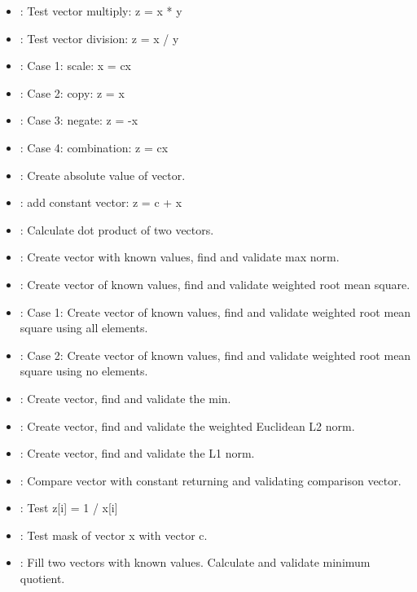 \begin{itemize}
\item {}: Test vector multiply: z = x * y
\item {}: Test vector division: z = x / y
\item {}: Case 1: scale: x = cx
\item {}: Case 2: copy: z = x
\item {}: Case 3: negate: z = -x
\item {}: Case 4: combination: z = cx
\item {}: Create absolute value of vector. 
\item {}: add constant vector: z = c + x
\item {}: Calculate dot product of two vectors.
\item {}: Create vector with known values, find and validate max norm.
\item {}: Create vector of known values, find and validate weighted root mean square.
\item {}: Case 1: Create vector of known values,
      find and validate weighted root mean square using all elements.
\item {}: Case 2: Create vector of known values,
      find and validate weighted root mean square using no elements.
\item {}: Create vector, find and validate the min.
\item {}: Create vector, find and validate the weighted Euclidean L2 norm.
\item {}: Create vector, find and validate the L1 norm.
\item {}: Compare vector with constant returning and validating comparison vector.
\item {}: Test z[i] = 1 / x[i]
\item {}: Test mask of vector x with vector c.
\item {}: Fill two vectors with known values. Calculate and validate minimum quotient.
\end{itemize}
